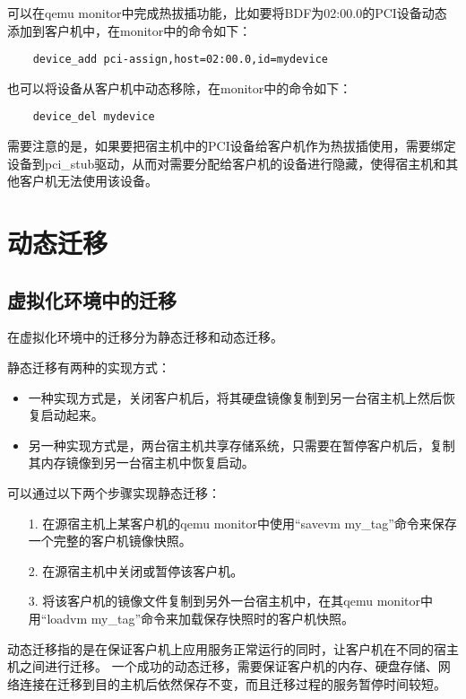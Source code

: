\documentclass[a4paper,left=2.5cm,right=2.5cm,11pt]{article}
\begin{document}
	可以在qemu monitor中完成热拔插功能，比如要将BDF为02:00.0的PCI设备动态添加到客户机中，在monitor中的命令如下：
	\begin{lstlisting}
	device_add pci-assign,host=02:00.0,id=mydevice
	\end{lstlisting}

	也可以将设备从客户机中动态移除，在monitor中的命令如下：
	\begin{lstlisting}
	device_del mydevice
	\end{lstlisting}

	需要注意的是，如果要把宿主机中的PCI设备给客户机作为热拔插使用，需要绑定设备到pci\_stub驱动，从而对需要分配给客户机的设备进行隐藏，使得宿主机和其他客户机无法使用该设备。

\clearpage

\section{动态迁移}
\subsection{虚拟化环境中的迁移}
	在虚拟化环境中的迁移分为静态迁移和动态迁移。\par
	静态迁移有两种的实现方式：
	\begin{itemize}
		\item 一种实现方式是，关闭客户机后，将其硬盘镜像复制到另一台宿主机上然后恢复启动起来。
		\item 另一种实现方式是，两台宿主机共享存储系统，只需要在暂停客户机后，复制其内存镜像到另一台宿主机中恢复启动。
	\end{itemize}

	可以通过以下两个步骤实现静态迁移：
	\begin{itemize}
		\item[1.] 在源宿主机上某客户机的qemu monitor中使用“savevm my\_tag”命令来保存一个完整的客户机镜像快照。
		\item[2.] 在源宿主机中关闭或暂停该客户机。
		\item[3.] 将该客户机的镜像文件复制到另外一台宿主机中，在其qemu monitor中用“loadvm my\_tag”命令来加载保存快照时的客户机快照。
	\end{itemize}

	动态迁移指的是在保证客户机上应用服务正常运行的同时，让客户机在不同的宿主机之间进行迁移。
	一个成功的动态迁移，需要保证客户机的内存、硬盘存储、网络连接在迁移到目的主机后依然保存不变，而且迁移过程的服务暂停时间较短。
\end{document}
